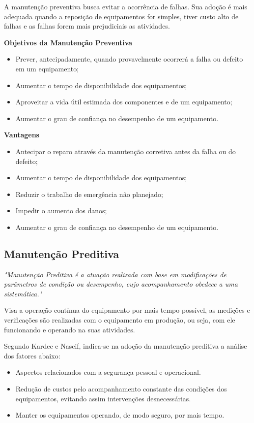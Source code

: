 		A manutenção preventiva busca evitar a ocorrência de falhas. Sua adoção é mais adequada quando a reposição de equipamentos for simples, tiver custo alto de falhas e as falhas forem mais prejudiciais as atividades.


		\textbf{Objetivos da Manutenção Preventiva}
			\begin{itemize}
				\item Prever, antecipadamente, quando provavelmente ocorrerá a falha ou defeito em um equipamento;    
				\item Aumentar o tempo de disponibilidade dos equipamentos; 
				\item Aproveitar a vida útil estimada dos componentes e de um equipamento; 
				\item Aumentar o grau de confiança no desempenho de um equipamento. 
			\end{itemize}

		\textbf{Vantagens}
			\begin{itemize}
				\item Antecipar o reparo através da manutenção corretiva antes da falha ou do defeito;    
				\item Aumentar o tempo de disponibilidade dos equipamentos; 
				\item Reduzir o trabalho de emergência não planejado; 
				\item Impedir o aumento dos danos; 
				\item Aumentar o grau de confiança no desempenho de um equipamento.
			\end{itemize}


\subsection{Manutenção Preditiva}

		\emph{"Manutenção Preditiva é a atuação realizada com base em modificações de parâmetros de condição ou desempenho, cujo acompanhamento obedece a uma sistemática."} \cite{kardecnascif2010}

		Visa a operação contínua do equipamento por mais tempo possível, as medições e verificações são realizadas com o equipamento em produção, ou seja, com ele funcionando e operando na suas atividades. 

		Segundo Kardec e Nascif, indica-se na adoção da manutenção preditiva a análise dos fatores abaixo:

			\begin{itemize}
				\item Aspectos relacionados com a segurança pessoal e operacional.
				\item Redução de custos pelo acompanhamento constante das condições dos equipamentos, evitando assim intervenções desnecessárias.
				\item Manter os equipamentos operando, de modo seguro, por mais tempo.
			\end{itemize}

